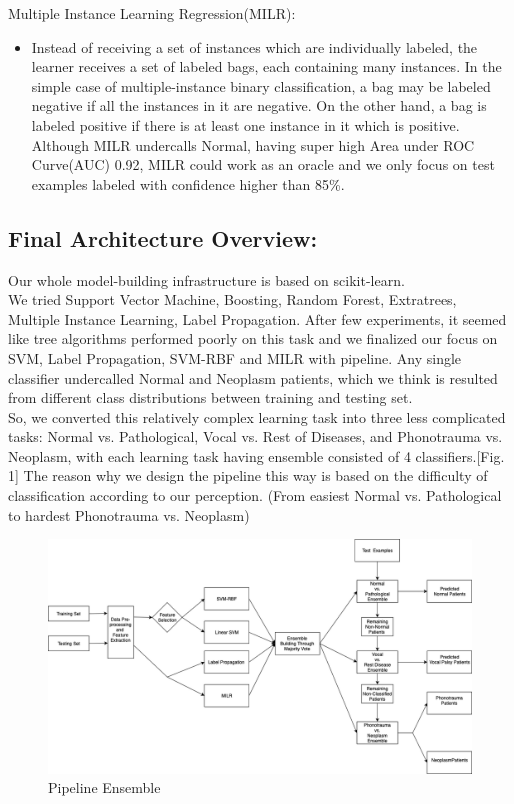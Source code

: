 Multiple Instance Learning Regression(MILR):\\
\begin{itemize}
	\item 
	Instead of receiving a set of instances which are individually labeled, the learner receives a set of labeled bags, each containing many instances. In the simple case of multiple-instance binary classification, a bag may be labeled negative if all the instances in it are negative. On the other hand, a bag is labeled positive if there is at least one instance in it which is positive. \cite{b10} Although MILR undercalls Normal, having super high Area under ROC Curve(AUC) 0.92, MILR could work as an oracle and we only focus on test examples labeled with confidence higher than 85\%.\\
\end{itemize}
\subsection{Final Architecture Overview:}
	Our whole model-building infrastructure is based on scikit-learn\cite{b7}\cite{b8}. \\
	\indent We tried Support Vector Machine, Boosting, Random Forest, Extratrees, Multiple Instance Learning, Label Propagation. After few experiments, it seemed like tree algorithms performed poorly on this task and we finalized our focus on SVM, Label Propagation, SVM-RBF and MILR with pipeline. Any single classifier undercalled Normal and Neoplasm patients, which we think is resulted from different class distributions between training and testing set. \\
\indent So, we converted this relatively complex learning task into three less complicated tasks: Normal vs. Pathological, Vocal vs. Rest of Diseases, and Phonotrauma vs. Neoplasm, with each learning task having ensemble consisted of 4 classifiers.[Fig. 1] The reason why we design the pipeline this way is based on the difficulty of classification according to our perception. (From easiest Normal vs. Pathological to hardest Phonotrauma vs. Neoplasm)\\
\begin{center}
	\begin{figure}[!htbp]
		\includegraphics[scale=0.35]{Diagram.png}
		\caption{Pipeline Ensemble}
	\end{figure}
\end{center}

